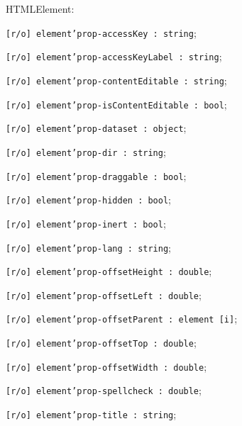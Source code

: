 \begin{icItems}
	\item HTMLElement:
	\begin{icItems}
		\item \texttt{[r/o] element'prop-accessKey : string};
		\item \texttt{[r/o] element'prop-accessKeyLabel : string};
		\item \texttt{[r/o] element'prop-contentEditable : string};
		\item \texttt{[r/o] element'prop-isContentEditable : bool};
		\item \texttt{[r/o] element'prop-dataset : object};
		\item \texttt{[r/o] element'prop-dir : string};
		\item \texttt{[r/o] element'prop-draggable : bool};
		\item \texttt{[r/o] element'prop-hidden : bool};
		\item \texttt{[r/o] element'prop-inert : bool};
		\item \texttt{[r/o] element'prop-lang : string};
		\item \texttt{[r/o] element'prop-offsetHeight : double};
		\item \texttt{[r/o] element'prop-offsetLeft : double};
		\item \texttt{[r/o] element'prop-offsetParent : element [i]};
		\item \texttt{[r/o] element'prop-offsetTop : double};
		\item \texttt{[r/o] element'prop-offsetWidth : double};
		\item \texttt{[r/o] element'prop-spellcheck : double};
		\item \texttt{[r/o] element'prop-title : string};
	\end{icItems}
	

\end{icItems}
